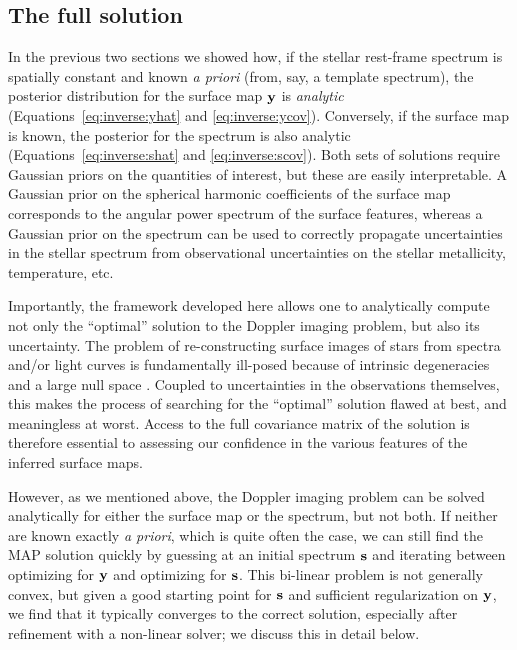 \documentclass[modern]{aastex62}
\begin{document}
\subsection{The full solution}
In the previous two sections we showed how, if the stellar
rest-frame spectrum is spatially constant and known \emph{a priori} 
(from, say, a template spectrum), the posterior distribution
for the surface map ${\mathbf{y}}$ is \emph{analytic} 
(Equations~\ref{eq:inverse:yhat}
and \ref{eq:inverse:ycov}). Conversely, if the surface map is known,
the posterior for the spectrum is also analytic 
(Equations~\ref{eq:inverse:shat} and \ref{eq:inverse:scov}). Both sets of
solutions require Gaussian priors on the quantities of interest, but these
are easily interpretable. A Gaussian prior on
the spherical harmonic coefficients of the surface map corresponds 
to the angular power spectrum of the surface features, whereas a Gaussian
prior on the spectrum can be used to correctly propagate uncertainties in
the stellar spectrum from observational uncertainties on the stellar
metallicity, temperature, etc.

Importantly, the framework developed here allows one to analytically
compute not only the ``optimal'' solution to the Doppler imaging problem,
but also its uncertainty. The problem of re-constructing surface images
of stars from spectra and/or light curves is fundamentally ill-posed because
of intrinsic degeneracies and a large null space
\citep[e.g.,][]{Luger2019} . Coupled to uncertainties in
the observations themselves, this makes the process of searching for the
``optimal'' solution flawed at best, and meaningless at worst. Access to the
full covariance matrix of the solution is therefore essential to assessing our
confidence in the various features of the inferred surface maps.

However, as we mentioned above, the Doppler imaging problem can be solved
analytically for either the surface map or the spectrum, but not both. If
neither are known exactly \emph{a priori}, which is quite often the case,
we can still find the MAP solution quickly by guessing at an initial
spectrum ${\mathbf{s}}$ and iterating between optimizing for ${\mathbf{y}}$ and
optimizing for ${\mathbf{s}}$. This bi-linear problem is not generally convex,
but given a good starting point for ${\mathbf{s}}$ and sufficient regularization
on ${\mathbf{y}}$, we find that it typically converges to the correct solution,
especially after refinement with a non-linear solver;
we discuss this in detail below.
\end{document}

